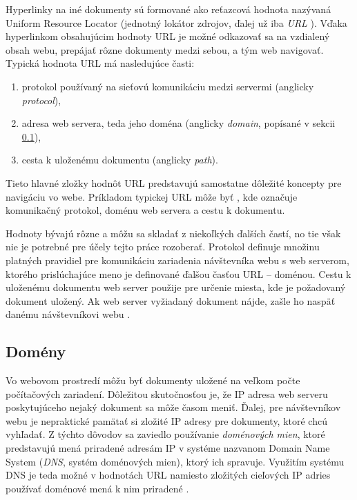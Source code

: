 Hyperlinky na iné dokumenty sú formované ako reťazcová hodnota nazývaná Uniform Resource Locator \cite{wiki-hyperlink} (jednotný lokátor zdrojov, ďalej už iba \emph{URL} \cite{rfc3986}).
Vďaka hyperlinkom obsahujúcim hodnoty URL je možné odkazovať sa na vzdialený obsah webu, prepájať rôzne dokumenty medzi sebou, a tým web navigovať.
Typická hodnota URL má nasledujúce časti:
\begin{enumerate}
    \item protokol používaný na sieťovú komunikáciu medzi servermi (anglicky \textit{protocol}),

    \item adresa web servera, teda jeho doména (anglicky \textit{domain}, popísané v sekcii \ref{domeny}),
    
    \item cesta k uloženému dokumentu (anglicky \emph{path}).
\end{enumerate}

Tieto hlavné zložky hodnôt URL predstavujú samostatne dôležité koncepty pre navigáciu vo webe.
Príkladom typickej URL môže byť , kde  označuje komunikačný protokol,  doménu web servera a  cestu k dokumentu. 

Hodnoty bývajú rôzne a môžu sa skladať z niekoľkých ďalších častí, no tie však nie je potrebné pre účely tejto práce rozoberať.
Protokol definuje množinu platných pravidiel pre komunikáciu zariadenia návštevníka webu s web 
serverom, ktorého prislúchajúce meno je definované ďalšou časťou URL -- doménou. 
Cestu k uloženému dokumentu web server použije pre určenie miesta, kde je požadovaný dokument uložený. 
Ak web server vyžiadaný dokument nájde, zašle ho naspäť danému návštevníkovi webu \cite{mdn-docs-url, wiki-web}.


\subsection{Domény}
\label{domeny}

Vo webovom prostredí môžu byť dokumenty uložené na veľkom počte počítačových zariadení.
Dôležitou skutočnosťou je, že IP adresa web serveru poskytujúceho nejaký dokument sa môže časom meniť.
Ďalej, pre návštevníkov webu je nepraktické pamätať si zložité IP adresy pre dokumenty, ktoré chcú vyhľadať.
Z týchto dôvodov sa zaviedlo používanie \emph{doménových mien}, ktoré predstavujú mená priradené adresám IP v systéme nazvanom 
Domain Name System (\emph{DNS}, systém doménových mien), ktorý ich spravuje. 
Využitím systému DNS je teda možné v hodnotách URL namiesto zložitých cieľových IP adries používať doménové mená k nim priradené \cite{cloudflare-dns}. 

